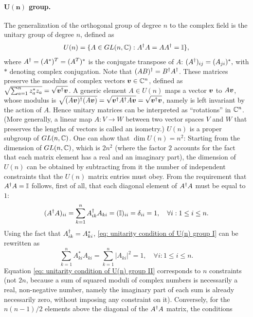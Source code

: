 \paragraph{$\bm{U(n)}$ group.} The generalization of the orthogonal group of degree $n$ to the complex field is the unitary group of degree $n$, defined as
    \begin{equation}
        U(n) = \{ A \in GL(n, \mathbb{C}) : A^\dagger A = A A^\dagger = \mathbb{I} \},
    \end{equation}
    where $A^\dagger = (A^*)^T = (A^T)^*$ is the conjugate transpose of $A$: $(A^\dagger)_{ij} = (A_{ji})^*,$ with $*$ denoting complex conjugation. Note that $(AB)^\dagger = B^\dagger A^\dagger$. These matrices preserve the modulus of complex vectors $\bm{v} \in \mathbb{C}^n$, defined as $\sqrt{\sum_{a=1}^n z_a^* z_a} = \sqrt{\bm{v}^\dagger \bm{v}}$. A generic element $A \in U(n)$ maps a vector $\bm{v}$ to $A\bm{v}$, whose modulus is $\sqrt{(A\bm{v})^\dagger (A\bm{v})} = \sqrt{\bm{v}^\dagger A^\dagger A \bm{v}} = \sqrt{\bm{v}^\dagger \bm{v}}$, namely is left invariant by the action of $A$. Hence unitary matrices can be interpreted as ``rotations'' in $\mathbb{C}^n$. (More generally, a linear map $A : V \to W$ between two vector spaces $V$ and $W$ that preserves the lengths of vectors is called an isometry.) $U(n)$ is a proper subgroup of $GL(n, \mathbb{C})$. One can show that $\dim U(n) = n^2$: Starting from the dimension of $GL(n, \mathbb{C})$, which is $2n^2$ (where the factor $2$ accounts for the fact that each matrix element has a real and an imaginary part), the dimension of $U(n)$ can be obtained by subtracting from it the number of independent constraints that the $U(n)$ matrix entries must obey. From the requirement that $A^\dagger A = \mathbb{I}$ follows, first of all, that each diagonal element of $A^\dagger A$ must be equal to $1$:
    \begin{equation}
    \label{eq: unitarity condition of U(n) group I}
        (A^\dagger A)_{ii} = \sum_{k=1}^n A^\dagger_{ik} A_{ki} = (\mathbb{I})_{ii} = \delta_{ii} = 1, \quad \forall i : 1 \le i \le n.
    \end{equation}
    Using the fact that $A^\dagger_{ik} = A^*_{ki}$, \eqref{eq: unitarity condition of U(n) group I} can be rewritten as
    \begin{equation}
    \label{eq: unitarity condition of U(n) group II}
        \sum_{k=1}^n A^*_{ki} A_{ki} = \sum_{k=1}^n |A_{ki}|^2 = 1, \quad \forall i : 1 \le i \le n.
    \end{equation}
    Equation \eqref{eq: unitarity condition of U(n) group II} corresponds to $n$ constraints (not $2n$, because a sum of squared moduli of complex numbers is necessarily a real, non-negative number, namely the imaginary part of each sum is already necessarily zero, without imposing any constraint on it). Conversely, for the $n(n-1)/2$ elements above the diagonal of the $A^\dagger A$ matrix, the conditions
